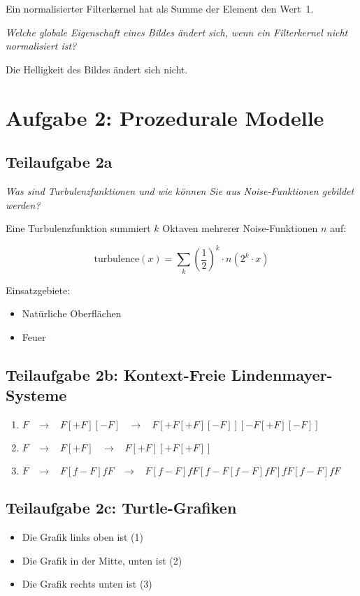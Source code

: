 \documentclass[a4paper]{scrartcl}
\begin{document}
Ein normalisierter Filterkernel hat als Summe der Element den Wert~1.

\textit{Welche globale Eigenschaft eines Bildes ändert sich, wenn ein Filterkernel nicht normalisiert ist?}

Die Helligkeit des Bildes ändert sich nicht.

\clearpage
\section*{Aufgabe 2: Prozedurale Modelle}
\subsection*{Teilaufgabe 2a}
\textit{Was sind Turbulenzfunktionen und wie können Sie aus Noise-Funktionen gebildet werden?}

Eine Turbulenzfunktion summiert $k$ Oktaven mehrerer Noise-Funktionen $n$ auf:

\[\text{turbulence}(x) = \sum_k \left (\frac{1}{2} \right )^k \cdot n(2^k \cdot x)\]

Einsatzgebiete:

\begin{itemize}
    \item Natürliche Oberflächen
    \item Feuer
\end{itemize}

\subsection*{Teilaufgabe 2b: Kontext-Freie Lindenmayer-Systeme}

\begin{enumerate}[label=(\arabic*)]
    \item $F \;\;\;\rightarrow\;\;\;F [+F][-F]\;\;\;\rightarrow\;\;\;F [+F [+F][-F]] [-F [+F][-F]]$
    \item $F \;\;\;\rightarrow\;\;\;F[+F]\;\;\;\rightarrow\;\;\;F[+F][+F[+F]]$
    \item $F \;\;\;\rightarrow\;\;\;F [f - F] fF\;\;\;\rightarrow\;\;\;F [f - F] fF [f - F [f - F] fF] fF [f - F] fF$
\end{enumerate}

\subsection*{Teilaufgabe 2c: Turtle-Grafiken}

\begin{itemize}
    \item Die Grafik links oben ist (1)
    \item Die Grafik in der Mitte, unten ist (2)
    \item Die Grafik rechts unten ist (3)
\end{itemize}
\end{document}
